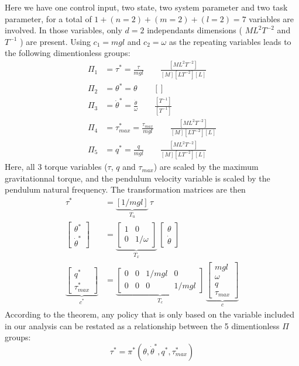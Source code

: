 Here we have one control input, two state, two system parameter and two task parameter, for a total of $1+(n=2)+(m=2)+(l=2)=7$ variables are involved. In those variables, only $d=2$ independants dimensions ( $ML^2T^{-2}$ and $T^{-1}$ ) are present. Using $c_1 = mgl$ and $c_2 = \omega$ as the repeating variables leads to the following dimentionless groups:
\begin{align}
\Pi_1 &= \tau^* = \frac{\tau}{mgl} \quad \quad \frac{[ML^2T^{-2}]}{[M][LT^{-2}][L]} \\
\Pi_2 &= \theta^* = \theta \quad \quad []\\
\Pi_3 &= \dot{\theta}^* = \frac{ \dot{\theta}  }{ \omega } \quad \quad \frac{[T^{-1}]}{[T^{-1}]} \\
\Pi_4 &= \tau_{max}^* = \frac{\tau_{max}}{mgl} \quad \quad \frac{[ML^2T^{-2}]}{[M][LT^{-2}][L]} \\
\Pi_5 &= q^* = \frac{q}{mgl} \quad \quad \frac{[ML^2T^{-2}]}{[M][LT^{-2}][L]} 
\end{align}
Here, all 3 torque variables ($\tau$, $q$ and $\tau_{max}$) are scaled by the maximum gravitationnal torque, and the pendulum velocity variable is scaled by the pendulum natural frequency. The transformation matrices are then
\begin{align}
\tau^* &= 
\underbrace{\left[  1/mgl \right]}_{T_u}
\, \tau  \label{eq:Tupendulum} \\
\begin{bmatrix}
\theta^* \\ \dot{\theta}^*
\end{bmatrix} &= 
\underbrace{
\begin{bmatrix}
    1 & 0 \\ 0 & 1/\omega
\end{bmatrix}
}_{T_x} \, 
\begin{bmatrix}
\theta \\ \dot{\theta}
\end{bmatrix}
 \label{eq:Txpendulum} \\
\underbrace{
\begin{bmatrix}
q^* \\ \tau_{max}^*
\end{bmatrix} 
}_{c^*} 
&= 
\underbrace{
\begin{bmatrix}
 0 & 0  & 1/mgl & 0 \\  0 & 0  & 0 &  1/mgl
\end{bmatrix}
}_{T_c} \, 
\underbrace{
\begin{bmatrix}
mgl \\ \omega \\ q \\ \tau_{max}
\end{bmatrix}
}_{c} 
 \label{eq:Tcpendulum} 
\end{align}
According to the theorem, any policy that is only based on the variable included in our analysis can be restated as a relationship between the 5 dimentionless $\Pi$ groups:
\begin{equation}
\tau^*
=
\pi^* \left(
\theta, \dot{\theta}^*,
q^* , \tau_{max}^* 
\right)
\end{equation}

